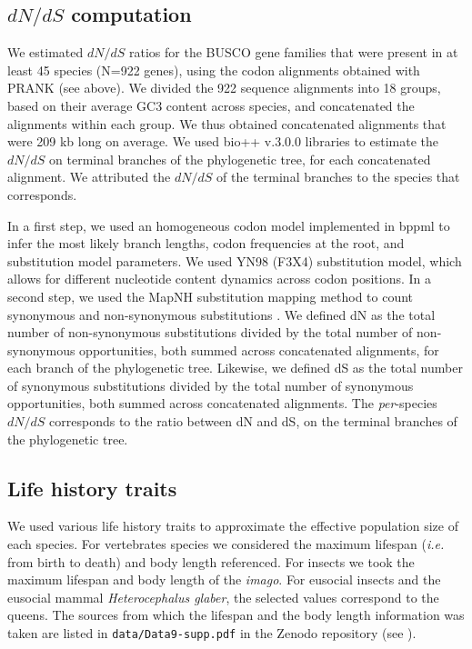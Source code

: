 \subsection{${dN}/{dS}$ computation}
We estimated ${dN}/{dS}$ ratios for the \acrshort{BUSCO} gene families that were present in at least 45 species (N=922 genes), using the codon alignments obtained with PRANK (see above). 
We divided the 922 sequence alignments into 18 groups, based on their average GC3 content across species, and concatenated the alignments within each group. We thus obtained concatenated alignments that were 209 kb long on average.
We used bio++ v.3.0.0 libraries \citep{gueguen_bio_2013, dutheil_non-homogeneous_2008, bolivar_gc-biased_2019} to estimate the ${dN}/{dS}$ on terminal branches of the phylogenetic tree, for each concatenated alignment. We attributed the ${dN}/{dS}$ of the terminal branches to the species that corresponds.

In a first step, we used an homogeneous codon model implemented in bppml to infer the most likely branch lengths, codon frequencies at the root, and substitution model parameters. We used YN98 (F3X4) \citep{yang_synonymous_1998} substitution model, which allows for different nucleotide content dynamics across codon positions. In a second step, we used the MapNH substitution mapping method \citep{gueguen_unbiased_2018} to count synonymous and non-synonymous substitutions \citep{dutheil_efficient_2012}. 
We defined dN as the total number of non-synonymous substitutions divided by the total number of non-synonymous opportunities, both summed across concatenated alignments, for each branch of the phylogenetic tree. Likewise, we defined dS as the total number of synonymous substitutions divided by the total number of synonymous opportunities, both summed across concatenated alignments. The \textit{per}-species ${dN}/{dS}$ corresponds to the ratio between dN and dS, on the terminal branches of the phylogenetic tree.

\subsection{Life history traits}
We used various life history traits to approximate the effective population size of each species.
For vertebrates species we considered the maximum lifespan (\textit{i.e.} from birth to death) and body length referenced. For insects we took the maximum lifespan and body length of the \textit{imago}. For eusocial insects and the eusocial mammal \textit{Heterocephalus glaber}, the selected values correspond to the queens.
The sources from which the lifespan and the body length information was taken are listed in \verb|data/Data9-supp.pdf| in the Zenodo repository (see ).

